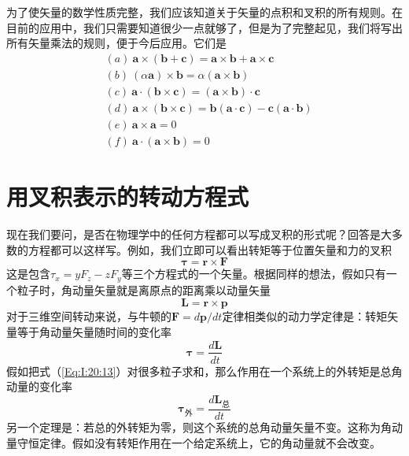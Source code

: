 为了使矢量的数学性质完整，我们应该知道关于矢量的点积和叉积的所有规则。在目前的应用中，我们只需要知道很少一点就够了，但是为了完整起见，我们将写出所有矢量乘法的规则，便于今后应用。它们是
\begin{equation}
    \label{Eq:I:20:10}
    \begin{aligned}
        &(a)~\boldsymbol{a} \times (\boldsymbol{b} + \boldsymbol{c}) = \boldsymbol{a} \times \boldsymbol{b} + \boldsymbol{a} \times \boldsymbol{c} \\
        &(b)~(\alpha \boldsymbol{a}) \times \boldsymbol{b} = \alpha (\boldsymbol{a} \times \boldsymbol{b}) \\
        &(c)~\boldsymbol{a} \cdot (\boldsymbol{b} \times \boldsymbol{c}) = (\boldsymbol{a} \times \boldsymbol{b}) \cdot \boldsymbol{c} \\ 
        &(d)~\boldsymbol{a} \times (\boldsymbol{b} \times \boldsymbol{c}) = \boldsymbol{b}(\boldsymbol{a} \cdot \boldsymbol{c}) - \boldsymbol{c} (\boldsymbol{a} \cdot \boldsymbol{b}) \\
        &(e)~\boldsymbol{a} \times \boldsymbol{a} = 0 \\
        &(f)~\boldsymbol{a} \cdot (\boldsymbol{a} \times \boldsymbol{b}) = 0
    \end{aligned}
\end{equation}

\section{用叉积表示的转动方程式}

现在我们要问，是否在物理学中的任何方程都可以写成叉积的形式呢？回答是大多数的方程都可以这样写。例如，我们立即可以看出转矩等于位置矢量和力的叉积
\begin{equation}
    \label{Eq:I:20:11}
    \boldsymbol{\tau} = \boldsymbol{r} \times \boldsymbol{F}
\end{equation}
这是包含$\tau_x=yF_z-zF_y$等三个方程式的一个矢量。根据同样的想法，假如只有一个粒子时，角动量矢量就是离原点的距离乘以动量矢量
\begin{equation}
    \label{Eq:I:20:12}
    \boldsymbol{L} = \boldsymbol{r} \times \boldsymbol{p}
\end{equation}
对于三维空间转动来说，与牛顿的$\boldsymbol{F}=d\boldsymbol{p}/dt$定律相类似的动力学定律是：转矩矢量等于角动量矢量随时间的变化率
\begin{equation}
    \label{Eq:I:20:13}
    \boldsymbol{\tau} = \frac{d\boldsymbol{L}}{dt} 
\end{equation}
假如把式（\ref{Eq:I:20:13}）对很多粒子求和，那么作用在一个系统上的外转矩是总角动量的变化率
\begin{equation}
    \label{Eq:I:20:14}
    \boldsymbol{\tau_\text{外}} = \frac{d\boldsymbol{L}_\text{总}}{dt} 
\end{equation}
另一个定理是：若总的外转矩为零，则这个系统的总角动量矢量不变。这称为角动量守恒定律。假如没有转矩作用在一个给定系统上，它的角动量就不会改变。

